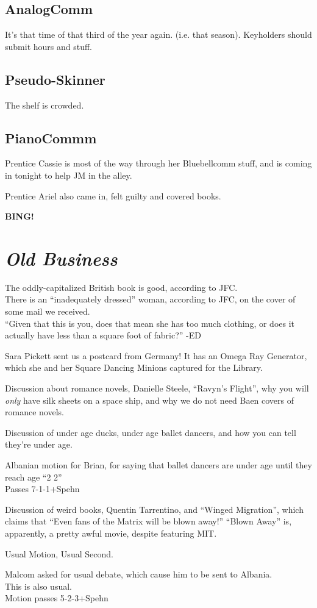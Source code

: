 \documentclass[10pt]{article}
\newcommand{\bing}{{\bf BING!} }
\newcommand{\goto}[1]{\bing \vskip 12pt \section*{{\em{#1}}}}
\begin{document}
\subsection*{AnalogComm}
It's that time of that third of the year again. (i.e. that season).
Keyholders should submit hours and stuff.

\subsection*{Pseudo-Skinner}
The shelf is crowded.

\subsection*{PianoCommm}
Prentice Cassie is most of the way through her Bluebellcomm stuff, and
is coming in tonight to help JM in the alley.

Prentice Ariel also came in, felt guilty and covered books.

\goto{Old Business}

The oddly-capitalized British book is good, according to JFC.\\
There is an ``inadequately dressed'' woman, according to JFC, on the
cover of some mail we received.  \\
``Given that this is you, does that mean she has too much clothing, or
does it actually have less than a square foot of fabric?'' -ED

Sara Pickett sent us a postcard from Germany! It has an Omega Ray
Generator, which she and her Square Dancing Minions captured for the Library.

Discussion about romance novels, Danielle Steele, ``Ravyn's
Flight'', why you will \emph{only} have silk sheets on a space ship, and why
we do not need Baen covers of romance novels.

Discussion of under age ducks, under age ballet dancers, and how you can
tell they're under age.

Albanian motion for Brian, for saying that ballet dancers are under age
until they reach age ``2 2''\\
Passes 7-1-1+Spehn

Discussion of weird books, Quentin Tarrentino, and ``Winged
Migration'', which claims that ``Even fans of the Matrix will be blown
away!''  ``Blown Away'' is, apparently, a pretty awful movie, despite
featuring MIT.

Usual Motion, Usual Second.

Malcom asked for usual debate, which cause him to be sent to Albania.\\
This is also usual.\\
Motion passes 5-2-3+Spehn
\end{document}
